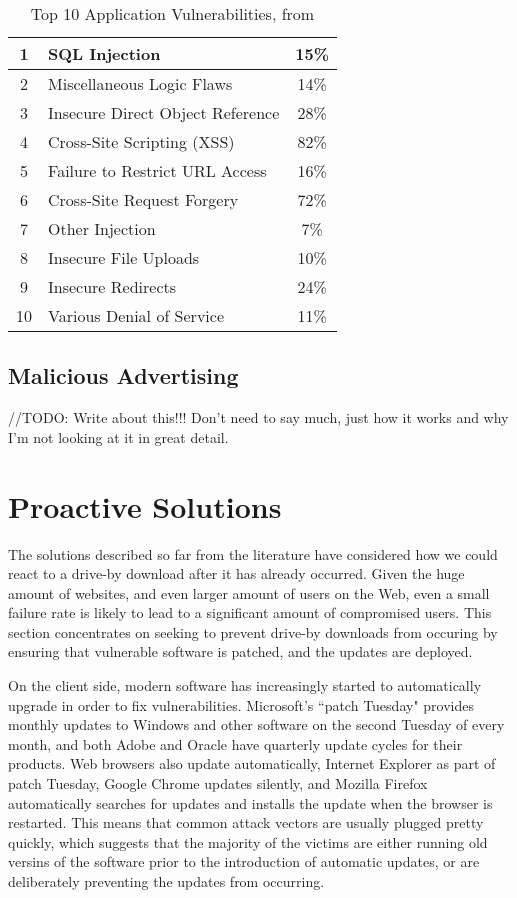 \documentclass{acm_proc_article-sp}
\begin{document}
\begin{table}
       \label{tab:trustwave}
       \caption{Top 10 Application Vulnerabilities, from \cite{trustwave}}
       \begin{tabular}{|c|p{5cm}|c|} 
       \hline
       1 & SQL Injection & 15\% \\
       \hline
       2 & Miscellaneous Logic Flaws & 14\% \\
       \hline
       3 & Insecure Direct Object Reference & 28\% \\
       \hline
       4 & Cross-Site Scripting (XSS)  & 82\% \\
       \hline
       5 & Failure to Restrict URL Access & 16\% \\
       \hline
       6 & Cross-Site Request Forgery & 72\% \\
       \hline
       7 & Other Injection &  7\% \\
       \hline
       8 &  Insecure File Uploads & 10\% \\
       \hline
       9 & Insecure Redirects & 24\% \\
       \hline
       10 & Various Denial of Service & 11\% \\
       \hline
       \end{tabular}
\end{table}

\subsection{Malicious Advertising}
//TODO: Write about this!!!  Don't need to say much, just how it works and why I'm not looking at it in great detail.

\section{Proactive Solutions}
The solutions described so far from the literature have considered how we could react to a drive-by download after it has already occurred.  Given the huge amount of websites, and even larger amount of users on the Web, even a small failure rate is likely to lead to a significant amount of compromised users.  This section concentrates on seeking to prevent drive-by downloads from occuring by ensuring that vulnerable software is patched, and the updates are deployed.

On the client side, modern software has increasingly started to automatically upgrade in order to fix vulnerabilities.  Microsoft's ``patch Tuesday" provides monthly updates to Windows and other software on the second Tuesday of every month, and both Adobe and Oracle have quarterly update cycles for their products.  Web browsers also update automatically, Internet Explorer as part of patch Tuesday, Google Chrome updates silently, and Mozilla Firefox automatically searches for updates and installs the update when the browser is restarted.  This means that common attack vectors are usually plugged pretty quickly, which suggests that the majority of the victims are either running old versins of the software prior to the introduction of automatic updates, or are deliberately preventing the updates from occurring.
\end{document}
